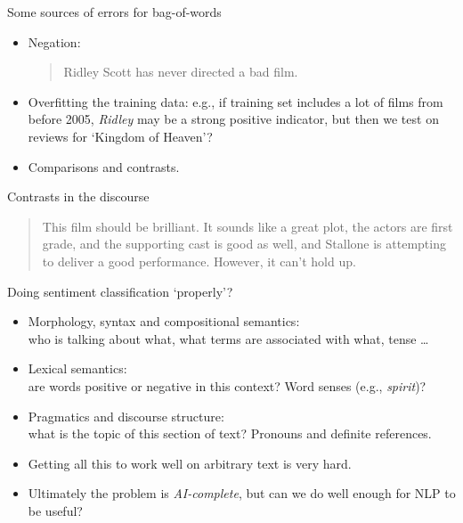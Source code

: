 \documentclass[compress]{beamer}
\begin{document}
\begin{frame}{Some sources of errors for bag-of-words}
  \begin{itemize}
  \item Negation:
    \begin{quote}
      Ridley Scott has never directed a bad film.
    \end{quote}
  \item Overfitting the training data: e.g., if training set includes
    a lot of films from before 2005, {\it Ridley} may be a strong
    positive indicator, but then we test on reviews for `Kingdom of
    Heaven'?
  \item Comparisons and contrasts.
  \end{itemize}
\end{frame}

\begin{frame}{Contrasts in the discourse}
\begin{quote}
  This film should be brilliant. It sounds like a great plot, the
  actors are first grade, and the supporting cast is good as well, and
  Stallone is attempting to deliver a good performance.  However, it
  can't hold up.
\end{quote}
\end{frame}


\begin{frame}{Doing sentiment classification `properly'?}
  \begin{itemize}
  \item Morphology, syntax and compositional semantics:\\
    who is talking about what, what terms are associated with what,
    tense \ldots
  \item Lexical semantics:\\ are words positive or negative
    \alert{in this context}?  Word senses (e.g., {\it spirit})?\\
  \item Pragmatics and discourse structure:\\
    what is the topic of this section of text?  Pronouns and definite
    references.
  \item Getting all this to work well on arbitrary text is very hard.
  \item Ultimately the problem is \emph{AI-complete}, but can we do
    well enough for NLP to be useful?
\end{itemize}
\end{frame}
\end{document}
